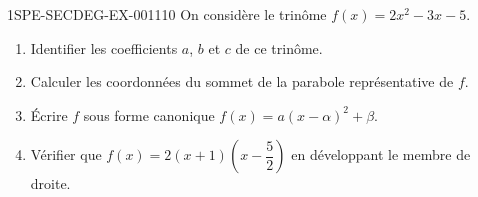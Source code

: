\begin{exercice}{1SPE-SECDEG-EX-001}{1}{10}
On considère le trinôme $f(x) = 2x^2 - 3x - 5$.

\begin{enumerate}
  \item Identifier les coefficients $a$, $b$ et $c$ de ce trinôme.
  \item Calculer les coordonnées du sommet de la parabole représentative de $f$.
  \item Écrire $f$ sous forme canonique $f(x) = a(x - \alpha)^2 + \beta$.
  \item Vérifier que $f(x) = 2\left(x + 1\right)\!\left(x - \dfrac{5}{2}\right)$ en développant le membre de droite.
\end{enumerate}
\end{exercice}
